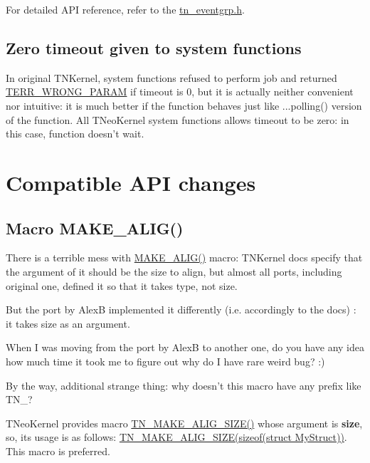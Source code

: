 For detailed A\+P\+I reference, refer to the {\ttfamily \hyperlink{tn__eventgrp_8h}{tn\+\_\+eventgrp.\+h}}.\hypertarget{tnkernel_diff_tnkernel_diff_zero_timeout}{}\subsection{Zero timeout given to system functions}\label{tnkernel_diff_tnkernel_diff_zero_timeout}
In original T\+N\+Kernel, system functions refused to perform job and returned {\ttfamily \hyperlink{tn__oldsymbols_8h_a35ec519d54f884d84c5814f49f00a22b}{T\+E\+R\+R\+\_\+\+W\+R\+O\+N\+G\+\_\+\+P\+A\+R\+A\+M}} if {\ttfamily timeout} is 0, but it is actually neither convenient nor intuitive\+: it is much better if the function behaves just like {\ttfamily ...polling()} version of the function. All T\+Neo\+Kernel system functions allows timeout to be zero\+: in this case, function doesn't wait.\hypertarget{tnkernel_diff_tnkernel_new_api}{}\section{Compatible A\+P\+I changes}\label{tnkernel_diff_tnkernel_new_api}
\hypertarget{tnkernel_diff_tnkernel_diff_make_alig}{}\subsection{Macro M\+A\+K\+E\+\_\+\+A\+L\+I\+G()}\label{tnkernel_diff_tnkernel_diff_make_alig}
There is a terrible mess with {\ttfamily \hyperlink{tn__oldsymbols_8h_aa42d2e6b5b7ff37bd485803fa2cb70a8}{M\+A\+K\+E\+\_\+\+A\+L\+I\+G()}} macro\+: T\+N\+Kernel docs specify that the argument of it should be the size to align, but almost all ports, including original one, defined it so that it takes type, not size.

But the port by Alex\+B implemented it differently (i.\+e. accordingly to the docs) \+: it takes size as an argument.

When I was moving from the port by Alex\+B to another one, do you have any idea how much time it took me to figure out why do I have rare weird bug? \+:)

By the way, additional strange thing\+: why doesn't this macro have any prefix like {\ttfamily T\+N\+\_\+}?

T\+Neo\+Kernel provides macro {\ttfamily \hyperlink{tn__common_8h_a3f48380e8a624edc643319a81192d88e}{T\+N\+\_\+\+M\+A\+K\+E\+\_\+\+A\+L\+I\+G\+\_\+\+S\+I\+Z\+E()}} whose argument is {\bfseries size}, so, its usage is as follows\+: {\ttfamily \hyperlink{tn__common_8h_a3f48380e8a624edc643319a81192d88e}{T\+N\+\_\+\+M\+A\+K\+E\+\_\+\+A\+L\+I\+G\+\_\+\+S\+I\+Z\+E(sizeof(struct My\+Struct))}}. This macro is preferred.

